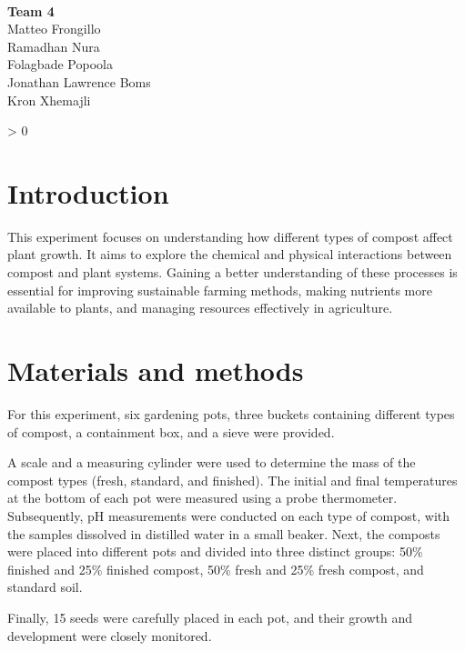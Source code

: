 \documentclass{article}
\makeatletter
\newcommand{\wrapfill}{
    \par
    \ifnum \value{WF@wrappedlines} > 0
        \addtocounter{WF@wrappedlines}{-1}%
        \null\vspace{
            \arabic{WF@wrappedlines}
            \baselineskip
        }
        \WFclear
    \fi
    \phantom{}
}
\makeatother
\begin{document}
\phantom{}\\[-1cm]

\begin{flushright}
        \large
        \textbf{Team 4}\\
        Matteo Frongillo\\
        Ramadhan Nura\\
        Folagbade Popoola\\
        Jonathan Lawrence Boms\\
        Kron Xhemajli
\end{flushright}
\wrapfill

\tableofcontents
\pagebreak

\section{Introduction}
This experiment focuses on understanding how different types of compost affect plant
growth. It aims to explore the chemical and physical interactions between compost and
plant systems. Gaining a better understanding of these processes is essential for
improving sustainable farming methods, making nutrients more available to plants, and
managing resources effectively in agriculture.

\section{Materials and methods}
For this experiment, six gardening pots, three buckets containing different types of 
compost, a containment box, and a sieve were provided.

A scale and a measuring cylinder were used to determine the mass of the compost types
(fresh, standard, and finished). The initial and final temperatures at the bottom of each
pot were measured using a probe thermometer. Subsequently, pH measurements were conducted on each type of compost, with the samples
dissolved in distilled water in a small beaker. Next, the composts were placed into different pots and divided into three distinct
groups: 50\% finished and 25\% finished compost, 50\% fresh and 25\% fresh compost, and
standard soil.

Finally, 15 seeds were carefully placed in each pot, and their growth and development
were closely monitored.
\vspace*{.6cm}
\end{document}
